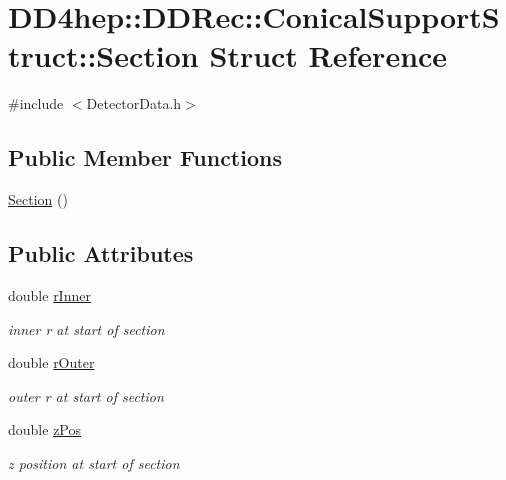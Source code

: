 \hypertarget{struct_d_d4hep_1_1_d_d_rec_1_1_conical_support_struct_1_1_section}{}\section{D\+D4hep\+:\+:D\+D\+Rec\+:\+:Conical\+Support\+Struct\+:\+:Section Struct Reference}
\label{struct_d_d4hep_1_1_d_d_rec_1_1_conical_support_struct_1_1_section}


{\ttfamily \#include $<$Detector\+Data.\+h$>$}

\subsection*{Public Member Functions}
\begin{DoxyCompactItemize}
\item 
\hyperlink{struct_d_d4hep_1_1_d_d_rec_1_1_conical_support_struct_1_1_section_a01a1dcdce026423d946fae269b6a99de}{Section} ()
\end{DoxyCompactItemize}
\subsection*{Public Attributes}
\begin{DoxyCompactItemize}
\item 
double \hyperlink{struct_d_d4hep_1_1_d_d_rec_1_1_conical_support_struct_1_1_section_a9affb6ab8e0306b5c87a794adede9c32}{r\+Inner}
\begin{DoxyCompactList}\small\item\em inner r at start of section \end{DoxyCompactList}\item 
double \hyperlink{struct_d_d4hep_1_1_d_d_rec_1_1_conical_support_struct_1_1_section_a2bf73928a0b64cdbc0b58f724c90126a}{r\+Outer}
\begin{DoxyCompactList}\small\item\em outer r at start of section \end{DoxyCompactList}\item 
double \hyperlink{struct_d_d4hep_1_1_d_d_rec_1_1_conical_support_struct_1_1_section_a078b08f486bacca5f6de87ac1bba2b97}{z\+Pos}
\begin{DoxyCompactList}\small\item\em z position at start of section \end{DoxyCompactList}\end{DoxyCompactItemize}


